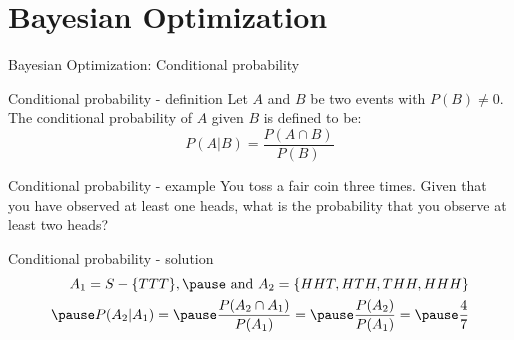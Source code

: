 \section{Bayesian Optimization}
\begin{frame}[c]{Bayesian Optimization: Conditional probability}

\begin{block}{Conditional probability - definition}
    Let $A$ and $B$ be two events with $P(B) \neq 0$. The conditional probability of $A$ given $B$ is defined to be:
	\begin{equation}
	    P(A \vert B) = \frac{P(A \cap B)}{P(B)}
    \label{eq:cond_prob}  
	\end{equation}
\end{block}

\pause

\begin{block}{Conditional probability - example}
   You toss a fair coin three times. Given that you have observed at least one heads, what is the probability that you observe at least two heads? 
\end{block}

\pause

\begin{block}{Conditional probability - solution}
	\begin{equation*}
    \begin{aligned}
        A_1 = S - \{TTT\}, \pause \textrm{ and } A_2 = \{HHT, HTH ,THH, HHH\} \\ \pause
        P(A_2 \vert A_1) =  \pause \frac{P(A_2 \cap A_1)}{P(A_1)} =  \pause \frac{P(A_2)}{P(A_1)} =  \pause \frac{4}{7}
    \end{aligned}
    \end{equation*}
\end{block}




\end{frame}

